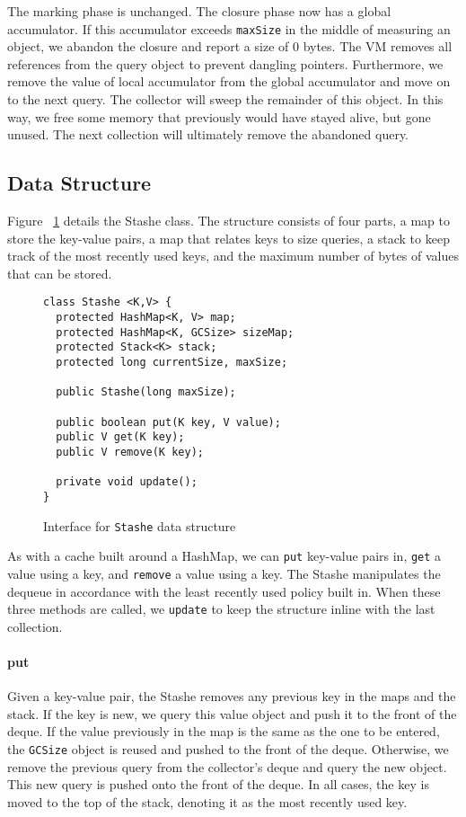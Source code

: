 The marking phase is unchanged. The closure phase now has a global
accumulator. If this accumulator exceeds \lstinline{maxSize} in the middle of
measuring an object, we abandon the closure and report a size of 0 bytes. The VM
removes all references from the query object to prevent dangling
pointers. Furthermore, we remove the value of local accumulator from the global
accumulator and move on to the next query. The collector will sweep the
remainder of this object. In this way, we free some memory that previously would
have stayed alive, but gone unused. The next collection will ultimately remove
the abandoned query.

\subsection{Data Structure}

Figure ~\ref{fig:stashe} details the Stashe class. The structure consists of
four parts, a map to store the key-value pairs, a map that relates keys to size
queries, a stack to keep track of the most recently used keys, and the maximum
number of bytes of values that can be stored.

\begin{figure}[t]
\begin{lstlisting}
class Stashe <K,V> {
  protected HashMap<K, V> map;
  protected HashMap<K, GCSize> sizeMap;
  protected Stack<K> stack;
  protected long currentSize, maxSize;

  public Stashe(long maxSize);

  public boolean put(K key, V value);
  public V get(K key);
  public V remove(K key);

  private void update();
}
\end{lstlisting}
\caption{Interface for \lstinline{Stashe} data structure}\label{fig:stashe}
\end{figure}

As with a cache built around a HashMap, we can \lstinline{put} key-value pairs
in, \lstinline{get} a value using a key, and \lstinline{remove} a value using a
key. The Stashe manipulates the dequeue in accordance with the least recently
used policy built in. When these three methods are called, we \lstinline{update}
to keep the structure inline with the last collection.

\paragraph{put} 
Given a key-value pair, the Stashe removes any previous key in the maps and the
stack. If the key is new, we query this value object and push it to the front of
the deque. If the value previously in the map is the same as the one to be
entered, the \lstinline{GCSize} object is reused and pushed to the front of the
deque. Otherwise, we remove the previous query from the collector's deque and
query the new object. This new query is pushed onto the front of the deque. In
all cases, the key is moved to the top of the stack, denoting it as the most
recently used key.

